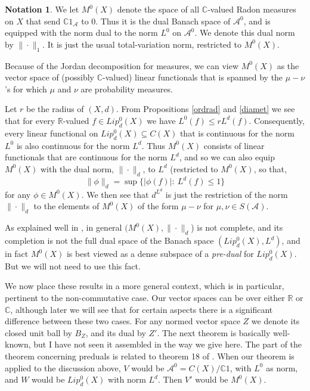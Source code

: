 \documentclass{amsart}[14pt]
\theoremstyle{definition}
\newtheorem{notation}[theorem]{Notation}
\theoremstyle{remark}
\newcommand{\cA}{{\mathcal A}}
\newcommand{\bC}{{\mathbb C}}
\newcommand{\bR}{{\mathbb R}}
\newcommand{\<}{\langle}
\renewcommand{\>}{\rangle}
\numberwithin{equation}{section}
\begin{document}
{\begin{notation}
\label{pd}
We let $M^0(X)$ denote the space of all $\bC$-valued
Radon measures on $X$ that send $\bC 1_\cA$ to 0.
Thus it is the dual Banach space of $\cA^0$, and is equipped
with the norm dual to the norm $L^0$ on $\cA^0$.
We denote this dual norm by $\|\cdot\|_1$. It is 
just the usual total-variation norm, restricted to $M^0(X)$.
\end{notation}

 Because of the Jordan decomposition
for measures,  we can view
$M^0(X)$ as the vector space of (possibly $\bC$-valued)
linear functionals that is spanned by the
$\mu - \nu$'s for which $\mu$ and $\nu$ are probability measures.

Let $r$ be the radius of $(X, d)$.
From Propositions \ref{ordrad} and \ref{diamet}
we see that for every $\bR$-valued $f \in Lip^0_d(X)$ we have
$L^0(f) \leq rL^d(f)$. Consequently, every linear functional 
on $Lip^0_d(X) \subseteq C(X)$
that is continuous for the norm $L^0$ is also continuous
for the norm $L^d$. Thus $M^0(X)$ consists of linear
functionals that are continuous for the norm $L^d$, and
so we can also equip $M^0(X)$ with the
dual norm, $\| \cdot \|_d $, to $L^d$ (restricted to $M^0(X)$, so that,
\begin{equation}
\label{dnorm}
\|\phi\|_d = \sup \{ |\phi(f)|: \  L^d(f) \leq 1\}  
\end{equation}
for any $\phi \in M^0(X)$. 
We then see that $d^{L^d}$ is just the restriction of the norm
$\| \cdot \|_d $ to the elements of $M^0(X)$ of the form
$\mu - \nu$ for $\mu, \nu \in S(\cA)$.

As explained well in \cite{Wvr4, Wvr3, Var2}, in general
$(M^0(X), \| \cdot \|_d $) is not complete,
and its completion is not the full dual space
of the Banach space $ (Lip^0_d(X), L^d)$,
and in fact $M^0(X)$ is best viewed as
a dense subspace of
a \emph{pre-dual} for $Lip^0_d(X)$. But we will not need
to use this fact.

We now place these results in a more general context, which is
in particular, pertinent to
the non-commutative case. Our vector spaces can be over either
$\bR$ or $\bC$, although later we will see that for certain aspects there is a 
significant difference between these two cases.
For any normed vector space $Z $ we denote its closed unit ball by $B_Z$, 
and its dual by $Z'$. The next theorem is basically well-known,
but I have not seen it assembled in the way we give here. 
The part of the theorem concerning preduals is related to theorem 18 of \cite{Dxm4}.
When our theorem is applied to the discussion above, 
$V$ would be $\cA^0 =C(X)/\bC 1$, with $L^0$ as norm, and $W$
would be $Lip^0_d(X)$ with norm  $L^d$. 
Then $V'$ would be $M^0(X)$.

}
\end{document}
